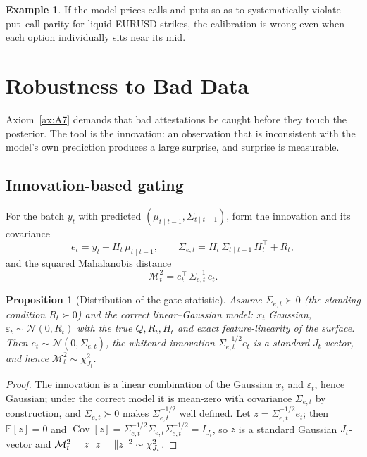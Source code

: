 \documentclass[11pt]{book}
\theoremstyle{plain}
\newtheorem{proposition}[theorem]{Proposition}
\theoremstyle{definition}
\newtheorem{example}[theorem]{Example}
\theoremstyle{remark}
\newcommand{\ncdf}{N}                            %
\newcommand{\Nrm}{\mathcal{N}}                   %
\newcommand{\E}{\mathbb{E}}
\newcommand{\Cov}{\operatorname{Cov}}
\DeclarePairedDelimiter{\norm}{\lVert}{\rVert}
\begin{document}
\begin{example}
If the model prices calls and puts so as to systematically violate put--call
parity for liquid EURUSD strikes, the calibration is wrong even when each option
individually sits near its mid.
\end{example}

\section{Robustness to Bad Data}
\label{sec:robustness}

Axiom~\ref{ax:A7} demands that bad attestations be caught before they touch the
posterior. The tool is the innovation: an observation that is inconsistent with
the model's own prediction produces a large surprise, and surprise is measurable.

\subsection{Innovation-based gating}

For the batch $y_t$ with predicted $(\mu_{t\mid t-1},\Sigma_{t\mid t-1})$, form the
innovation and its covariance
\[
    e_t = y_t - H_t\,\mu_{t\mid t-1},
    \qquad
    \Sigma_{e,t} = H_t\,\Sigma_{t\mid t-1}\,H_t^{\top} + R_t,
\]
and the squared Mahalanobis distance
\[
    \mathcal{M}_t^2 = e_t^{\top}\,\Sigma_{e,t}^{-1}\,e_t .
\]

\begin{proposition}[Distribution of the gate statistic]
\label{prop:chi2}
Assume $\Sigma_{e,t}\succ0$ (the standing condition $R_t\succ0$) and the correct
linear--Gaussian model: $x_t$ Gaussian, $\varepsilon_t\sim\Nrm(0,R_t)$ with the
\emph{true} $Q,R_t,H_t$ and exact feature-linearity of the surface. Then
$e_t\sim\Nrm(0,\Sigma_{e,t})$, the whitened innovation $\Sigma_{e,t}^{-1/2}e_t$ is
a standard $J_t$-vector, and hence $\mathcal{M}_t^2\sim\chi^2_{J_t}$.
\end{proposition}

\begin{proof}
The innovation is a linear combination of the Gaussian $x_t$ and
$\varepsilon_t$, hence Gaussian; under the correct model it is mean-zero with
covariance $\Sigma_{e,t}$ by construction, and $\Sigma_{e,t}\succ0$ makes
$\Sigma_{e,t}^{-1/2}$ well defined. Let
$z=\Sigma_{e,t}^{-1/2}e_t$; then $\E[z]=0$ and
$\Cov[z]=\Sigma_{e,t}^{-1/2}\Sigma_{e,t}\Sigma_{e,t}^{-1/2}=I_{J_t}$, so $z$ is a
standard Gaussian $J_t$-vector and
$\mathcal{M}_t^2=z^{\top}z=\norm{z}^2\sim\chi^2_{J_t}$.
\end{proof}
\end{document}

